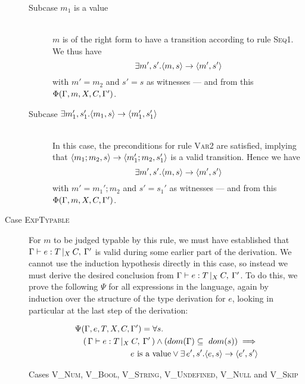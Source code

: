 \documentclass[a4paper]{article}
\begin{document}
\begin{description}
			\begin{description}
				\item[Subcase $m_1$ is a value] \hfill \\
					$m$ is of the right form to have a transition according to
					rule \textsc{Seq1}. We thus have 
					$$\exists m', s'.\langle{}m,s\rangle{}\rightarrow{}\langle{}m',s'\rangle$$
					with $m'=m_2$ and $s'=s$ as witnesses ---
					and from this \\
					$\Phi(\Gamma, m, X, C, \Gamma')$. \\
					
				\item[Subcase $\exists m_1', s_1'.\langle{}m_1,s\rangle{}\rightarrow{}\langle{}m_1',s_1'\rangle$] \hfill \\
					In this case, the preconditions for rule \textsc{Var2} are
					satisfied, implying that 
					$\langle{}m_1;m_2,s\rangle{}\rightarrow{}\langle{}m_1';m_2,s_1'\rangle$
					is a valid transition. Hence we have
					$$\exists m', s'.\langle{}m,s\rangle{}\rightarrow{}\langle{}m',s'\rangle$$
					with $m'=m_1';m_2$ and $s'=s_1'$ as witnesses ---
					and from this \\
					$\Phi(\Gamma, m, X, C, \Gamma')$.
			\end{description}

		\item[Case \textsc{ExpTypable}] \hfill

			For $m$ to be judged typable by this rule, we must have
			established that $\Gamma{}\vdash e: T\,|_X\:C,\:\Gamma'$ is valid during some earlier part
			of the derivation. We cannot use the induction hypothesis directly
			in this case, so instead we must derive the desired conclusion
			from $\Gamma{}\vdash e: T\,|_X\:C,\:\Gamma'$. To do this, we prove the following $\Psi$ for
			all expressions in the language, again by induction over the
			structure of the type derivation for $e$, looking in particular at
			the last step of the derivation:

			\begin{eqnarray*}
			\lefteqn{ \indHypTwo =  \forall s.} \\
				& & (\,\typed{e}{T}\,) \wedge
						(dom(\Gamma) \subseteq\ dom(s))
					\implies \\
				& & \quad \textrm{$e$ is a value} \vee
						\exists{}\, e', s'. \transition{e}{s}{e'}{s'}
			\end{eqnarray*}

			\begin{description}

				\item[Cases \textsc{V\_Num}, \textsc{V\_Bool},
				\textsc{V\_String}, \textsc{V\_Undefined}, \textsc{V\_Null} and
				\textsc{V\_Skip}] \hfill 


\end{description}
\end{description}
\end{document}
